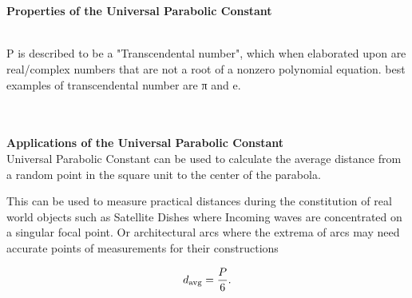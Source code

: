\begin{enumerate}
\\\\
 \textbf{Properties of the  Universal Parabolic Constant }
 
 \\
 
 P is described to be a  "Transcendental number", which when elaborated upon are real/complex numbers that are not a root of a nonzero polynomial equation. best examples of transcendental number are π and e. 
 
 \\
 \\
 \textbf{Applications of the Universal Parabolic Constant}
 \\
Universal Parabolic Constant can be used to calculate the average distance from a random point in the square unit to the center of the parabola. 

This can be used to measure practical distances during the constitution of real world objects such as Satellite Dishes where Incoming waves are concentrated on a singular focal point. Or architectural arcs where the extrema of arcs may need accurate points of measurements for their constructions 

 \begin{equation}
{d_{\text{avg}}={P \over 6}.}
 \end{equation}

 
 
\end{enumerate}